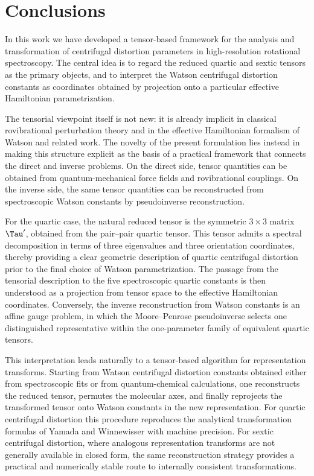 \section{Conclusions}

In this work we have developed a tensor-based framework for the
analysis and transformation of centrifugal distortion parameters in
high-resolution rotational spectroscopy.  The central idea is to
regard the reduced quartic and sextic tensors as the primary objects,
and to interpret the Watson centrifugal distortion constants as
coordinates obtained by projection onto a particular effective
Hamiltonian parametrization.

The tensorial viewpoint itself is not new: it is already implicit in
classical rovibrational perturbation theory and in the effective
Hamiltonian formalism of Watson and related work.  The novelty of the
present formulation lies instead in making this structure explicit as
the basis of a practical framework that connects the direct and inverse
problems.  On the direct side, tensor quantities can be obtained from
quantum-mechanical force fields and rovibrational couplings.  On the
inverse side, the same tensor quantities can be reconstructed from
spectroscopic Watson constants by pseudoinverse reconstruction.

For the quartic case, the natural reduced tensor is the symmetric
$3\times 3$ matrix $\Tau'$, obtained from the pair--pair quartic
tensor.  This tensor admits a spectral decomposition in terms of three
eigenvalues and three orientation coordinates, thereby providing a
clear geometric description of quartic centrifugal distortion prior to
the final choice of Watson parametrization.  The passage from the
tensorial description to the five spectroscopic quartic constants is
then understood as a projection from tensor space to the effective
Hamiltonian coordinates.  Conversely, the inverse reconstruction from
Watson constants is an affine gauge problem, in which the
Moore--Penrose pseudoinverse selects one distinguished representative
within the one-parameter family of equivalent quartic tensors.

This interpretation leads naturally to a tensor-based algorithm for
representation transforms.  Starting from Watson centrifugal
distortion constants obtained either from spectroscopic fits or from
quantum-chemical calculations, one reconstructs the reduced tensor,
permutes the molecular axes, and finally reprojects the transformed
tensor onto Watson constants in the new representation.  For quartic
centrifugal distortion this procedure reproduces the analytical
transformation formulas of Yamada and Winnewisser with machine
precision.  For sextic centrifugal distortion, where analogous
representation transforms are not generally available in closed form,
the same reconstruction strategy provides a practical and numerically
stable route to internally consistent transformations.

